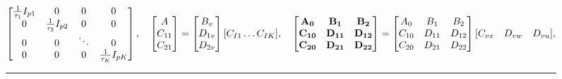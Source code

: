 \documentclass[twocolumn]{autart}    %
\begin{document}
\begin{figure}[htb]
\begin{equation}
\begin{aligned}
\begin{bmatrix}
            \frac{1}{\tau_{1}}I_{p1} & 0 & 0 & 0   \\
            0 & \frac{1}{\tau_{2}}I_{p2} & 0 & 0          \\
            0 & 0 &\ddots & 0  \\ 
            0 & 0 & 0 & \frac{1}{\tau_{K}}I_{pK}
            \end{bmatrix},    \quad \begin{bmatrix}
                                                        A \\
                                                        C_{11} \\
                                                        C_{21} 
                                                    \end{bmatrix}= 
                                                    \begin{bmatrix}
                                                        B_{v} \\
                                                        D_{1v} \\
                                                        D_{2v} 
                                                    \end{bmatrix}[C_{I1} \dots C_{IK}],   \quad\begin{bmatrix}
                                                        \bold{A_{0}} & \bold{B_{1}} & \bold{B_{2}} \\
                                                        \bold{C_{10}} & \bold{D_{11}} & \bold{D_{12}} \\
                                                        \bold{C_{20}} & \bold{D_{21}} & \bold{D_{22}} 
                                                    \end{bmatrix} = 
                                                    \begin{bmatrix}
                                                        A_{0} & B_{1} & B_{2} \\
                                                        C_{10} & D_{11} & D_{12} \\
                                                        C_{20} & D_{21} & D_{22}
                                                    \end{bmatrix}[C_{vx} \quad D_{vw} \quad D_{vu}],\\
\end{aligned}
    \end{equation}
    {\noindent}	 \rule[-10pt]{17.5cm}{0.05em}\\
\end{figure} 
\end{document}
